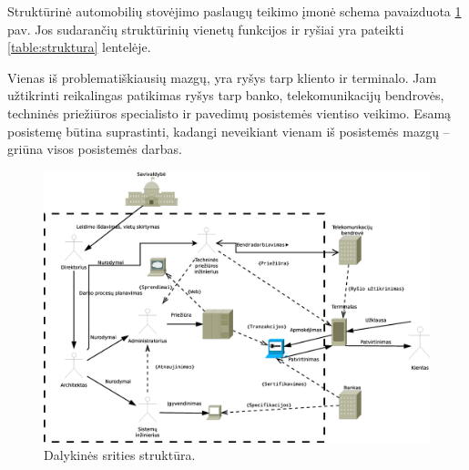 \documentclass[10pt]{IEEEtran}
\begin{document}
            Struktūrinė automobilių stovėjimo paslaugų teikimo įmonė schema pavaizduota \ref{fig:struktura} pav. Jos sudarančių struktūrinių vienetų funkcijos ir ryšiai yra pateikti \ref{table:struktura} lentelėje. 

            Vienas iš problematiškiausių mazgų, yra ryšys tarp kliento ir terminalo. Jam užtikrinti reikalingas patikimas ryšys tarp banko, telekomunikacijų bendrovės, techninės priežiūros specialisto ir pavedimų posistemės vientiso veikimo. Esamą posistemę būtina suprastinti, kadangi neveikiant vienam iš posistemės mazgų -- griūna visos posistemės darbas.

            \begin{figure}[t]
                \centering
                \includegraphics[width=500px]{figures/struktura.eps}
                \caption{Dalykinės srities struktūra.}
                \label{fig:struktura}
            \end{figure}
\end{document}
